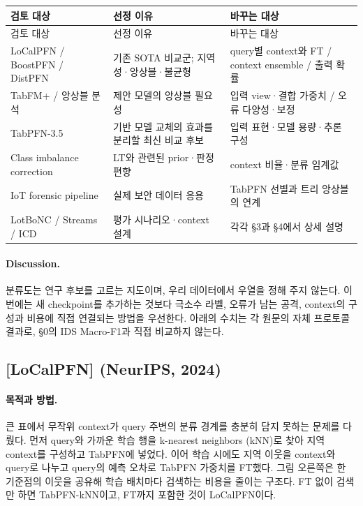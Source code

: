 \begingroup
\footnotesize
\begin{longtable}{>{\raggedright\arraybackslash}p{}>{\raggedright\arraybackslash}p{}>{\raggedright\arraybackslash}p{}}
\toprule
검토 대상 & 선정 이유 & 바꾸는 대상 \\ \midrule
\endfirsthead
검토 대상 & 선정 이유 & 바꾸는 대상 \\ \midrule
\endhead
{}LoCalPFN /\allowbreak{} BoostPFN /\allowbreak{} DistPFN & 기존 SOTA 비교군; 지역성·앙상블·불균형 & query별 context와 FT /\allowbreak{} context ensemble /\allowbreak{} 출력 확률 \\
{}TabFM+\allowbreak{} /\allowbreak{} 앙상블 분석 & 제안 모델의 앙상블 필요성 & 입력 view·결합 가중치 /\allowbreak{} 오류 다양성·보정 \\
{}TabPFN-3.5 & 기반 모델 교체의 효과를 분리할 최신 비교 후보 & 입력 표현·모델 용량·추론 구성 \\
{}Class imbalance correction & LT와 관련된 prior·판정 편향 & context 비율·분류 임계값 \\
{}IoT forensic pipeline & 실제 보안 데이터 응용 & TabPFN 선별과 트리 앙상블의 연계 \\
{}LotBoNC /\allowbreak{} Streams /\allowbreak{} ICD & 평가 시나리오·context 설계 & 각각 §3과 §4에서 상세 설명 \\
\bottomrule
\end{longtable}
\endgroup


\paragraph{Discussion.} 분류도는 연구 후보를 고르는 지도이며, 우리 데이터에서 우열을 정해 주지 않는다. 이번에는 새 checkpoint를 추가하는 것보다 극소수 라벨, 오류가 남는 공격, context의 구성과 비용에 직접 연결되는 방법을 우선한다. 아래의 수치는 각 원문의 자체 프로토콜 결과로, §0의 IDS Macro-F1과 직접 비교하지 않는다.


\subsection{[LoCalPFN] (NeurIPS, 2024)}

\paragraph{목적과 방법.} 큰 표에서 무작위 context가 query 주변의 분류 경계를 충분히 담지 못하는 문제를 다뤘다. 먼저 query와 가까운 학습 행을 k-nearest neighbors (kNN)로 찾아 지역 context를 구성하고 TabPFN에 넣었다. 이어 학습 시에도 지역 이웃을 context와 query로 나누고 query의 예측 오차로 TabPFN 가중치를 FT했다. 그림 오른쪽은 한 기준점의 이웃을 공유해 학습 배치마다 검색하는 비용을 줄이는 구조다. FT 없이 검색만 하면 TabPFN-kNN이고, FT까지 포함한 것이 LoCalPFN이다.


